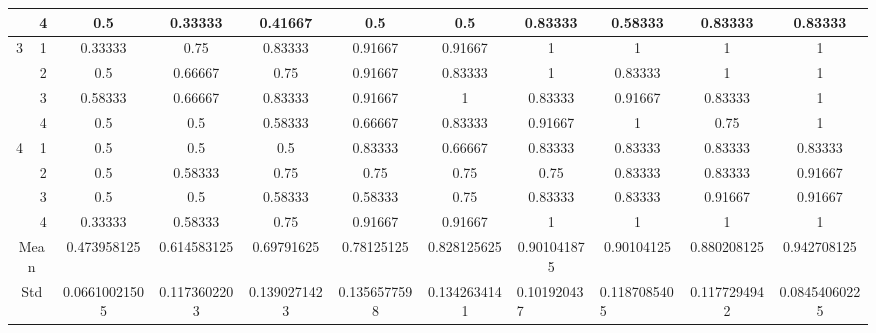 \documentclass[draft,dvipsnames]{drexel-thesis}
\begin{document}
\begin{thesis}
\begin{table}[!t]
{\begin{tabular}{|c|c|c|c|c|c|c|c|c|c|c|}
                      & 4                   & 0.5           & 0.33333      & 0.41667      & 0.5          & 0.5          & 0.83333                          & 0.58333                           & 0.83333      & 0.83333       \\ \hline
\multirow{4}{*}{3}    & 1                   & 0.33333       & 0.75         & 0.83333      & 0.91667      & 0.91667      & 1                                & 1                                 & 1            & 1             \\ \cline{2-11} 
                      & 2                   & 0.5           & 0.66667      & 0.75         & 0.91667      & 0.83333      & 1                                & 0.83333                           & 1            & 1             \\ \cline{2-11} 
                      & 3                   & 0.58333       & 0.66667      & 0.83333      & 0.91667      & 1            & 0.83333                          & 0.91667                           & 0.83333      & 1             \\ \cline{2-11} 
                      & 4                   & 0.5           & 0.5          & 0.58333      & 0.66667      & 0.83333      & 0.91667                          & 1                                 & 0.75         & 1             \\ \hline
\multirow{4}{*}{4}    & 1                   & 0.5           & 0.5          & 0.5          & 0.83333      & 0.66667      & 0.83333                          & 0.83333                           & 0.83333      & 0.83333       \\ \cline{2-11} 
                      & 2                   & 0.5           & 0.58333      & 0.75         & 0.75         & 0.75         & 0.75                             & 0.83333                           & 0.83333      & 0.91667       \\ \cline{2-11} 
                      & 3                   & 0.5           & 0.5          & 0.58333      & 0.58333      & 0.75         & 0.83333                          & 0.83333                           & 0.91667      & 0.91667       \\ \cline{2-11} 
                      & 4                   & 0.33333       & 0.58333      & 0.75         & 0.91667      & 0.91667      & 1                                & 1                                 & 1            & 1             \\ \hline
\multicolumn{2}{|c|}{Mean}                  & 0.473958125   & 0.614583125  & 0.69791625   & 0.78125125   & 0.828125625  & 0.901041875                      & 0.90104125                        & 0.880208125  & 0.942708125   \\ \hline
\multicolumn{2}{|c|}{Std}                   & 0.06610021505 & 0.1173602203 & 0.1390271423 & 0.1356577598 & 0.1342634141 & \multicolumn{1}{l|}{0.101920437} & \multicolumn{1}{l|}{0.1187085405} & 0.1177294942 & 0.08454060225 \\ \hline
\end{tabular}}
\end{table}


\end{thesis}
\end{document}
